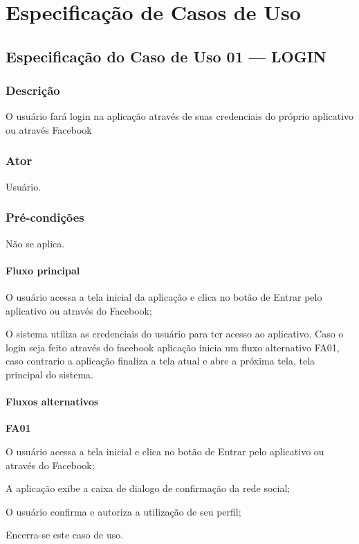 \chapter{Especificação de Casos de Uso} \label{apendice:a}

\section*{Especificação do Caso de Uso 01 --- LOGIN}
\subsection*{Descrição}
O usuário fará login na aplicação através de suas credenciais do próprio aplicativo ou através Facebook

\subsection*{Ator}
Usuário.

\subsection*{Pré-condições}
Não se aplica.

\subsubsection*{Fluxo principal}
\begin{lista}
	\item O usuário acessa a tela inicial da aplicação e clica no botão de Entrar pelo aplicativo ou através do Facebook; 
	\item O sistema utiliza as credenciais do usuário para ter acesso ao aplicativo. Caso o login seja feito através do facebook aplicação inicia um fluxo alternativo FA01, caso contrario a aplicação finaliza a tela atual e abre a próxima tela, tela principal do sistema.
\end{lista}

\subsubsection*{Fluxos alternativos}
\begin{lista}
	\item \textbf{FA01}
	\begin{lista}
		\item O usuário acessa a tela inicial e clica no botão de Entrar pelo aplicativo ou através do Facebook;
		\item A aplicação exibe a caixa de dialogo de confirmação da rede social;
		\item O usuário confirma e autoriza a utilização de seu perfil;
		\item Encerra-se este caso de uso.		
	\end{lista}
\end{lista}

